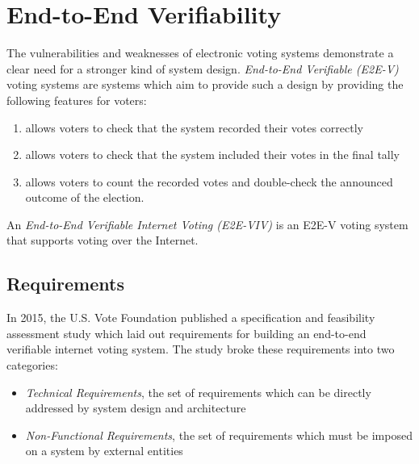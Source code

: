 \section{End-to-End Verifiability}\label{sec:e2e-viv}
The vulnerabilities and weaknesses of electronic voting systems demonstrate a
clear need for a stronger kind of system design. \emph{End-to-End Verifiable
(E2E-V)} voting systems are systems which aim to provide such a design by
providing the following features for voters:

\begin{enumerate}
  \item allows voters to check that the system recorded their votes correctly

  \item allows voters to check that the system included their votes in the final
    tally

  \item allows voters to count the recorded votes and double-check the announced
    outcome of the election.
\end{enumerate}

An \emph{End-to-End Verifiable Internet Voting (E2E-VIV)} is an E2E-V voting
system that supports voting over the Internet.



\subsection{Requirements}
In 2015, the U.S. Vote Foundation published a specification and feasibility
assessment study which laid out requirements for building an end-to-end
verifiable internet voting system. The study broke these requirements into two
categories:\cite{e2e-viv}

\begin{itemize}
  \item \emph{Technical Requirements}, the set of requirements which can be
    directly addressed by system design and architecture

  \item \emph{Non-Functional Requirements}, the set of requirements which must
    be imposed on a system by external entities
\end{itemize}

